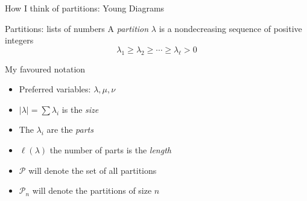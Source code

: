 \documentclass{beamer}
\begin{document}
\begin{frame}{How I think of partitions: Young Diagrams}
\end{frame}


\begin{frame}{Partitions: lists of numbers}
A \emph{partition} $\lambda$ is a nondecreasing sequence of positive integers 
 $$\lambda_1\geq \lambda_2\geq \cdots \geq \lambda_\ell>0$$ 

\begin{block}{My favoured notation}
\begin{itemize}
\item Preferred variables: $\lambda, \mu, \nu$
\item $|\lambda|=\sum \lambda_i$ is the \emph{size}
    \item The $\lambda_i$ are the \emph{parts}
    \item $\ell(\lambda)$ the number of parts is the \emph{length}
    \item $\mathcal{P}$ will denote the set of all partitions
    \item $\mathcal{P}_n$ will denote the partitions of size $n$
\end{itemize} 
\end{block}


\end{frame}
\end{document}
